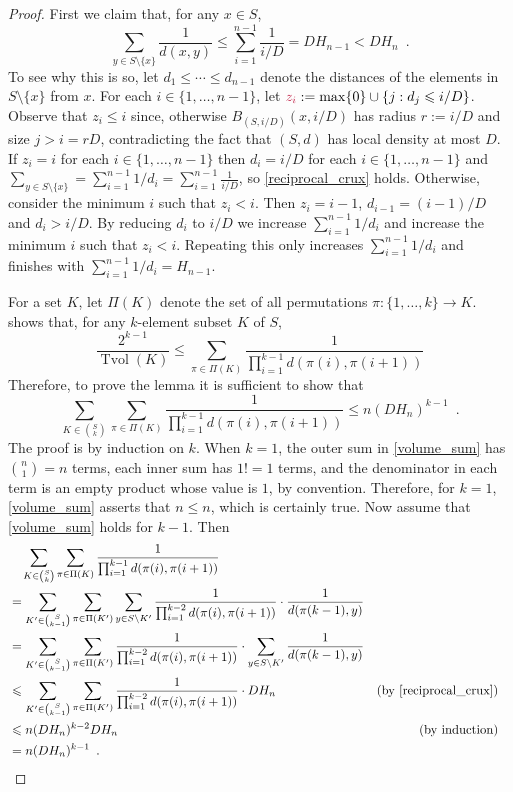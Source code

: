 \documentclass{patmorin}
\makeatletter
\renewcommand{\le}{\leqslant}
\def\mathcolor#1#{\@mathcolor{#1}}
\def\@mathcolor#1#2#3{%
  \protect\leavevmode
  \begingroup
    \color#1{#2}#3%
  \endgroup
}
\newcommand{\mathdefin}[1]{\mathcolor{brightmaroon}{#1}}
\DeclareMathOperator{\tvol}{Tvol}
\makeatother
\begin{document}
\begin{proof}
  First we claim that, for any $x\in S$,
  \begin{equation}
    \sum_{y\in S\setminus\{x\}} \frac{1}{d(x,y)} \le \sum_{i=1}^{n-1}\frac{1}{i/D} = DH_{n-1} < DH_n \enspace . \label{reciprocal_crux}
  \end{equation}
  To see why this is so, let $d_1\le\cdots\le d_{n-1}$ denote the distances of the elements in $S\setminus\{x\}$ from $x$.  For each $i\in\{1,\ldots,n-1\}$, let $\mathdefin{z_i}:=\max\{0\}\cup\{j: d_j \le i/D\}$. Observe that $z_i \le i$ since, otherwise $B_{(S,i/D)}(x,i/D)$ has radius $r:=i/D$ and size $j>i=rD$, contradicting the fact that $(S,d)$ has local density at most $D$.  If $z_i=i$ for each $i\in\{1,\ldots,n-1\}$ then $d_i=i/D$ for each $i\in\{1,\ldots,n-1\}$ and $\sum_{y\in S\setminus\{x\}}=\sum_{i=1}^{n-1}1/d_i=\sum_{i=1}^{n-1}\frac{1}{i/D}$, so \eqref{reciprocal_crux} holds.  Otherwise, consider the minimum $i$ such that $z_i < i$.  Then $z_i=i-1$, $d_{i-1}=(i-1)/D$ and $d_i > i/D$. By reducing $d_i$ to $i/D$ we increase $\sum_{i=1}^{n-1} 1/d_i$ and increase the minimum $i$ such that $z_i < i$.  Repeating this only increases $\sum_{i=1}^{n-1} 1/d_i$ and finishes with $\sum_{i=1}^{n-1} 1/d_i= H_{n-1}$.

  For a set $K$, let $\Pi(K)$ denote the set of all permutations $\pi:\{1,\ldots,k\}\to K$.
  \citet[Lemma~17]{feige:approximating} shows that, for any $k$-element subset $K$ of $S$,
  \[
    \frac{2^{k-1}}{\tvol(K)} \le \sum_{\pi\in\Pi(K)}\frac{1}{\prod_{i=1}^{k-1}d(\pi(i),\pi(i+1))}
  \]
  Therefore, to prove the lemma it is sufficient to show that
  \begin{equation}
    \sum_{K\in\binom{S}{k}}\sum_{\pi\in\Pi(K)}\frac{1}{\prod_{i=1}^{k-1}d(\pi(i),\pi(i+1))} \le n(DH_n)^{k-1} \enspace .
    \label{volume_sum}
  \end{equation}
  The proof is by induction on $k$.  When $k=1$, the outer sum in \cref{volume_sum} has $\binom{n}{1}=n$ terms, each inner sum has $1!=1$ terms, and the denominator in each term is an empty product whose value is $1$, by convention.  Therefore, for $k=1$, \cref{volume_sum} asserts that $n \le n$, which is certainly true.  Now assume that \cref{volume_sum} holds for $k-1$.  Then
  \begin{align*}
    & \quad \sum_{K\in\binom{S}{k}}\sum_{\pi\in\Pi(K)}\frac{1}{\prod_{i=1}^{k-1}d(\pi(i),\pi(i+1))} \\
    & = \sum_{K'\in\binom{S}{k-1}}\sum_{\pi\in\Pi(K')}\sum_{y\in S\setminus K'}\frac{1}{\prod_{i=1}^{k-2}d(\pi(i),\pi(i+1))}\cdot\frac{1}{d(\pi(k-1),y)} \\
    & = \sum_{K'\in\binom{S}{k-1}}\sum_{\pi\in\Pi(K')}\frac{1}{\prod_{i=1}^{k-2}d(\pi(i),\pi(i+1))}\cdot\sum_{y\in S\setminus K'}\frac{1}{d(\pi(k-1),y)} \\
    & \le \sum_{K'\in\binom{S}{k-1}}\sum_{\pi\in\Pi(K')}\frac{1}{\prod_{i=1}^{k-2}d(\pi(i),\pi(i+1))}\cdot DH_n & \text{(by \cref{reciprocal_crux})}\\
    & \le n(DH_n)^{k-2}DH_n & \text{(by induction)}\\
    & = n(DH_n)^{k-1} \enspace . & & \qedhere
  \end{align*}
\end{proof}
\end{document}
